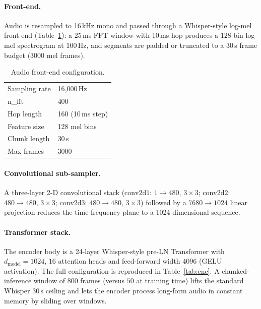 \paragraph{Front-end.}
Audio is resampled to 16\,kHz mono and passed through a Whisper-style
log-mel front-end (Table~\ref{tab:fe}): a 25\,ms FFT window with
10\,ms hop produces a $128$-bin log-mel spectrogram at 100\,Hz, and
segments are padded or truncated to a 30\,s frame budget (3000 mel
frames).

\begin{table}[t]
  \caption{Audio front-end configuration.}
  \label{tab:fe}
  \centering
  \small
  \begin{tabular}{ll}
    \toprule
    Sampling rate    & 16{,}000\,Hz \\
    n\_fft           & 400 \\
    Hop length       & 160 (10\,ms step) \\
    Feature size     & 128 mel bins \\
    Chunk length     & 30\,s \\
    Max frames       & 3000 \\
    \bottomrule
  \end{tabular}
\end{table}

\paragraph{Convolutional sub-sampler.}
A three-layer 2-D convolutional stack ($\text{conv2d1}$:
$1\!\to\!480$, $3\!\times\!3$; $\text{conv2d2}$: $480\!\to\!480$,
$3\!\times\!3$; $\text{conv2d3}$: $480\!\to\!480$, $3\!\times\!3$)
followed by a $7680\!\to\!1024$ linear projection reduces the time-frequency
plane to a 1024-dimensional sequence.

\paragraph{Transformer stack.}
The encoder body is a 24-layer Whisper-style pre-LN Transformer with
$d_{\text{model}}=1024$, $16$ attention heads and feed-forward width
$4096$ (GELU activation). The full configuration is reproduced in
Table~\ref{tab:enc}. A chunked-inference window of $800$ frames
(versus $50$ at training time) lifts the standard Whisper $30$\,s
ceiling and lets the encoder process long-form audio in constant
memory by sliding over windows.

